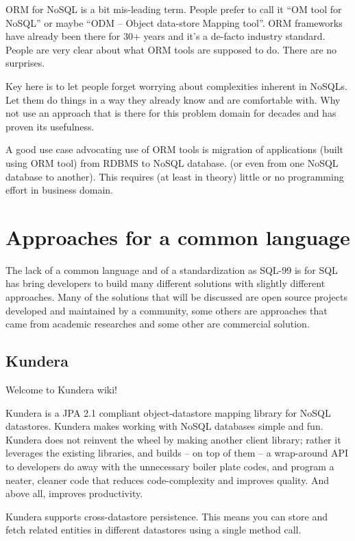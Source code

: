 ORM for NoSQL is a bit mis-leading term. People prefer to call it “OM tool for NoSQL” or maybe “ODM – Object data-store Mapping tool”. ORM frameworks have already been there for 30+ years and it’s a de-facto industry standard. People are very clear about what ORM tools are supposed to do. There are no surprises.

Key here is to let people forget worrying about complexities inherent in NoSQLs. Let them do things in a way they already know and are comfortable with. Why not use an approach that is there for this problem domain for decades and has proven its usefulness.

A good use case advocating use of ORM tools is migration of applications (built using ORM tool) from RDBMS to NoSQL database. (or even from one NoSQL database to another). This requires (at least in theory) little or no programming effort in business domain.



\section{Approaches for a common language}
\label{sec:common-language}
The lack of a common language and of a standardization as SQL-99 is for SQL has bring developers to build many different solutions with slightly different approaches.
Many of the solutions that will be discussed are open source projects developed and maintained by a community, some others are approaches that came from academic researches and some other are commercial solution.

\subsection{Kundera}
Welcome to Kundera wiki!

Kundera is a JPA 2.1 compliant object-datastore mapping library for NoSQL datastores. Kundera makes working with NoSQL databases simple and fun. Kundera does not reinvent the wheel by making another client library; rather it leverages the existing libraries, and builds – on top of them – a wrap-around API to developers do away with the unnecessary boiler plate codes, and program a neater, cleaner code that reduces code-complexity and improves quality. And above all, improves productivity.

Kundera supports cross-datastore persistence. This means you can store and fetch related entities in different datastores using a single method call.

